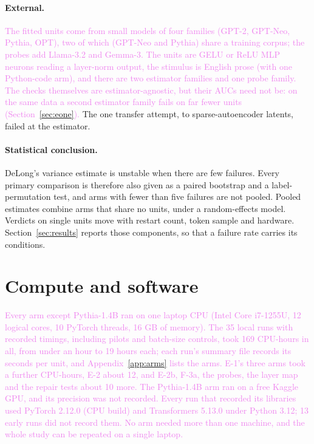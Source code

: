 \documentclass[10pt]{article}
\newcommand{\draft}[1]{\textcolor{violet}{#1}}
\begin{document}
\paragraph{External.} \draft{The fitted units come from small models of four families (GPT-2,
GPT-Neo, Pythia, OPT), two of which (GPT-Neo and Pythia) share a training corpus; the probes add
Llama-3.2 and Gemma-3. The units are GELU or ReLU MLP neurons reading a layer-norm output, the
stimulus is English prose (with one Python-code arm), and there are two estimator families and one
probe family. The checks themselves are estimator-agnostic, but their AUCs need not be: on the same
data a second estimator family fails on far fewer units (Section~\ref{sec:eone}).}
The one transfer attempt, to sparse-autoencoder latents, failed at the estimator.
\paragraph{Statistical conclusion.} DeLong's variance estimate is unstable when there are few
failures. Every primary comparison is therefore also given as a paired bootstrap and a
label-permutation test, and arms with fewer than five failures are not pooled. Pooled
estimates combine arms that share no units, under a random-effects model. Verdicts on single
units move with restart count, token sample and hardware. Section~\ref{sec:results} reports
those components, so that a failure rate carries its conditions.

\FloatBarrier
\section{Compute and software}
\label{app:compute}
\draft{Every arm except Pythia-1.4B ran on one laptop CPU (Intel Core i7-1255U, 12 logical cores,
10 PyTorch threads, 16 GB of memory). The 35 local runs with recorded timings, including pilots
and batch-size controls, took 169 CPU-hours in all, from under an hour to 19 hours each; each
run's summary file records its seconds per unit, and Appendix~\ref{app:arms} lists the arms. E-1's
three arms took a further \eOneHours{} CPU-hours, E-2 about 12, and E-2b, F-3a, the probes, the
layer map and the repair tests about 10 more. The
Pythia-1.4B arm ran on a free Kaggle GPU, and its precision was not recorded. Every run that
recorded its libraries used PyTorch 2.12.0 (CPU build) and Transformers 5.13.0 under Python
3.12; 13 early runs did not record them. No arm needed
more than one machine, and the whole study can be repeated on a single laptop.}
\end{document}
